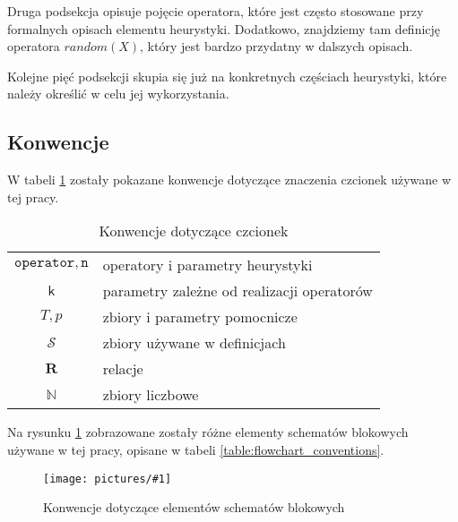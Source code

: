\documentclass[twoside]{iisthesis}
\newcommand{\numberSet}[1]{\mathbb{#1}}
\newcommand{\important}[1]{\mathcal{#1}}
\newcommand{\R}{\mathbf{R}}
\newcommand{\param}[1]{\mathtt{#1}}
\newcommand{\variable}[1]{\mathsf{#1}}
\newcommand{\img}[1]{\texttt{[image: pictures/\#1]}}
\begin{document}
Druga podsekcja opisuje pojęcie operatora, które jest często stosowane przy formalnych opisach elementu heurystyki. Dodatkowo, znajdziemy tam definicję operatora $random(X)$, który jest bardzo przydatny w dalszych opisach.

Kolejne pięć podsekcji skupia się już na konkretnych częściach heurystyki, które należy określić w celu jej wykorzystania.

\subsection{Konwencje} \label{subsection:conventions}

W tabeli \ref{table:signature_conventions} zostały pokazane konwencje dotyczące znaczenia czcionek używane w tej pracy.

\begin{table}[b]
	\caption{Konwencje dotyczące czcionek \label{table:signature_conventions}}
	\centering
	\begin{tabular}{cl}
		$\param{operator}, \param{n}$ & operatory i parametry heurystyki \\
		$\variable{k}$ & parametry zależne od realizacji operatorów \\
		$T, p$ & zbiory i parametry pomocnicze \\
		$\important{S}$ & zbiory używane w definicjach \\
		$\R$ & relacje \\
		$\numberSet{N}$ & zbiory liczbowe
	\end{tabular}
\end{table}

Na rysunku \ref{figure:flowchart_conventions} zobrazowane zostały różne elementy schematów blokowych używane w tej pracy, opisane w tabeli \ref{table:flowchart_conventions}.

\begin{figure}
	\caption{Konwencje dotyczące elementów schematów blokowych \label{figure:flowchart_conventions}}
	\img{conventions.png}
\end{figure}
\end{document}
